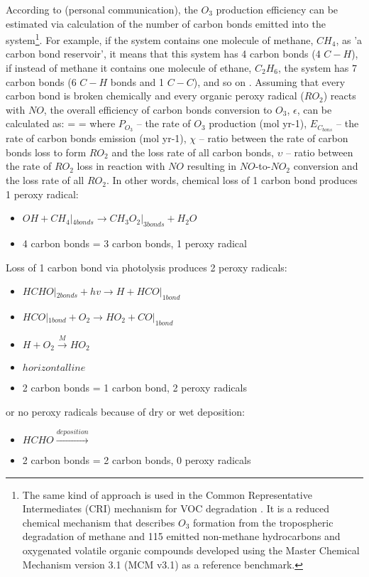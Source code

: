 \documentclass[11pt,a4paper]{article}
\newcounter{matriz}
\newenvironment{matriz}{\refstepcounter{matriz}\equation}{\tag{\thematriz}\endequation}
\begin{document}
According to \cite{Evans2014} (personal communication), the $O_3$ production efficiency can be estimated via calculation of the number of carbon bonds emitted into the system\footnote{The same kind of approach is used in the Common Representative Intermediates (CRI) mechanism for VOC degradation \citep{Jenkin2002, Jenkin2008}. It is a reduced chemical mechanism that describes $O_3$ formation from the tropospheric degradation of methane and 115 emitted non-methane hydrocarbons and oxygenated volatile organic compounds developed using the Master Chemical Mechanism version 3.1 (MCM v3.1) as a reference benchmark.}. For example, if the system contains one molecule of methane, $CH_4$, as 'a carbon bond reservoir', it means that this system has 4 carbon bonds (4 $C-H$), if  instead of methane it contains one molecule of ethane, $C_2H_6$, the system has 7 carbon bonds (6 $C-H$ bonds and 1 $C-C$), and so on \citep{Edwards2013}. Assuming that every carbon bond is broken chemically and every organic peroxy radical ($RO_2$) reacts with $NO$, the overall efficiency of carbon bonds conversion to $O_3$, $\epsilon$, can be calculated as: 
\begin{matriz}\label{eq:epsilon}
\epsilon =  = \chi\cdot\upsilon
\end{matriz}
where $P_{O_3}$ – the rate of $O_3$ production (mol yr-1), $E_{C_{bons}}$  – the rate of carbon bonds emission (mol yr-1), $\chi$ – ratio between the rate of carbon bonds loss to form $RO_2$ and the loss rate of all carbon bonds, $\upsilon$ – ratio between the rate of $RO_2$ loss in reaction with $NO$ resulting in $NO$-to-$NO_2$ conversion and the loss rate of all $RO_2$. In other words, chemical loss of 1 carbon bond produces 1 peroxy radical:
\begin{itemize}
\centering
\item[] $OH + {CH_4}|_{4 bonds} \rightarrow {CH_3O_2}|_{3 bonds} + H_2O$
\item[] 4 carbon bonds = 3 carbon bonds, 1 peroxy radical
\end{itemize}
Loss of 1 carbon bond via photolysis produces 2 peroxy radicals:
\begin{itemize}
\centering
\item[] ${HCHO}|_{2bonds} + hv \rightarrow H + {HCO}|_{1bond}$
\item[] ${HCO}|_{1bond} + O_2 \rightarrow HO_2 + {CO}|_{1bond}$
\item[] $H + O_2 \xrightarrow{M} HO_2$
\item[] $horizontal line$
\item[] 2 carbon bonds = 1 carbon bond, 2 peroxy radicals
\end{itemize}
or no peroxy radicals because of dry or wet deposition:
\begin{itemize}
\centering
\item[] $HCHO \xrightarrow{deposition}$
\item[] 2 carbon bonds = 2 carbon bonds, 0 peroxy radicals
\end{itemize}
\end{document}
